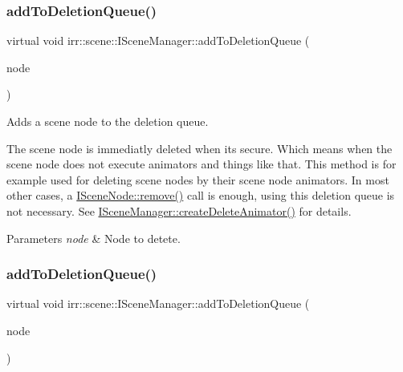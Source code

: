 \subsubsection{\texorpdfstring{add\+To\+Deletion\+Queue()}{addToDeletionQueue()}\hspace{0.1cm}{\footnotesize\ttfamily [1/2]}}
{\footnotesize\ttfamily virtual void irr\+::scene\+::\+I\+Scene\+Manager\+::add\+To\+Deletion\+Queue (\begin{DoxyParamCaption}\item[{\hyperlink{classirr_1_1scene_1_1ISceneNode}{I\+Scene\+Node} $\ast$}]{node }\end{DoxyParamCaption})\hspace{0.3cm}{\ttfamily [pure virtual]}}



Adds a scene node to the deletion queue. 

The scene node is immediatly deleted when it\textquotesingle{}s secure. Which means when the scene node does not execute animators and things like that. This method is for example used for deleting scene nodes by their scene node animators. In most other cases, a \hyperlink{classirr_1_1scene_1_1ISceneNode_a2efa2670e29d6bb33b0dd99403b8b69c}{I\+Scene\+Node\+::remove()} call is enough, using this deletion queue is not necessary. See \hyperlink{classirr_1_1scene_1_1ISceneManager_a163cc04ff2cb03852ac891de56200fa3}{I\+Scene\+Manager\+::create\+Delete\+Animator()} for details. 
\begin{DoxyParams}{Parameters}
{\em node} & Node to detete. \\
\hline
\end{DoxyParams}
\mbox{\label{classirr_1_1scene_1_1ISceneManager_a11eac917a4c75c7a7730198d7bf31f5a}} 
\subsubsection{\texorpdfstring{add\+To\+Deletion\+Queue()}{addToDeletionQueue()}\hspace{0.1cm}{\footnotesize\ttfamily [2/2]}}
{\footnotesize\ttfamily virtual void irr\+::scene\+::\+I\+Scene\+Manager\+::add\+To\+Deletion\+Queue (\begin{DoxyParamCaption}\item[{\hyperlink{classirr_1_1scene_1_1ISceneNode}{I\+Scene\+Node} $\ast$}]{node }\end{DoxyParamCaption})\hspace{0.3cm}{\ttfamily [pure virtual]}}



